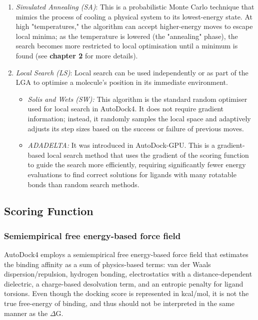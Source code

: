 \documentclass[12pt]{article}
\begin{document}
\begin{enumerate}
\item \emph{Simulated Annealing (SA)}: 
This is a probabilistic Monte Carlo technique that mimics the process of cooling a physical system to its lowest-energy state. At high "temperatures," the algorithm can accept higher-energy moves to escape local minima; as the temperature is lowered (the "annealing" phase), the search becomes more restricted to local optimisation until a minimum is found (see \textbf{chapter 2} for more details).

\item \emph{Local Search (LS)}: 
Local search can be used independently or as part of the LGA to optimise a molecule's position in its immediate environment.
\begin{itemize}
\item \emph{Solis and Wets (SW):} This algorithm is the standard random optimiser used for local search in AutoDock4. It does not require gradient information; instead, it randomly samples the local space and adaptively adjusts its step sizes based on the success or failure of previous moves.
\item \emph{ADADELTA:} It was introduced in AutoDock-GPU. This is a gradient-based local search method that uses the gradient of the scoring function to guide the search more efficiently, requiring significantly fewer energy evaluations to find correct solutions for ligands with many rotatable bonds than random search methods.
\end{itemize}
\end{enumerate}

\subsection{Scoring Function}

\subsubsection{Semiempirical free energy-based force field}

AutoDock4 employs a semiempirical free energy-based force field that estimates the binding affinity as a sum of physics-based terms: van der Waals dispersion/repulsion, hydrogen bonding, electrostatics with a distance-dependent dielectric, a charge-based desolvation term, and an entropic penalty for ligand torsions\cite{CH7_Huey2007,CH7_SantosMartins2021}. Even though the docking score is represented in kcal/mol, it is not the true free-energy of binding, and thus should not be interpreted in the same manner as the $\Delta\textrm{G}$. 
\end{document}
